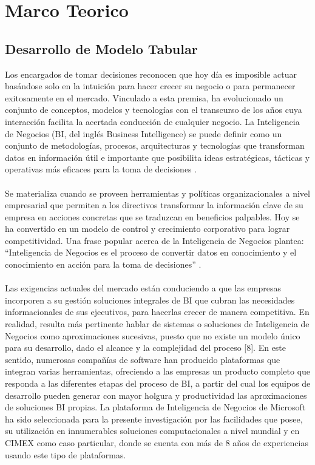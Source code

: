\documentclass[preprint,12pt]{elsarticle}
\begin{document}

\section{Marco Teorico}

\subsection{Desarrollo de Modelo Tabular}

Los encargados de tomar decisiones  reconocen que  hoy día  es imposible  actuar basándose  solo en  la intuición para hacer crecer su negocio o para permanecer exitosamente en el mercado. Vinculado a esta premisa, ha evolucionado un conjunto de conceptos, modelos y tecnologías con el transcurso de los años cuya interacción facilita la acertada conducción de cualquier negocio.  La Inteligencia de Negocios (BI, del inglés Business Intelligence) se puede definir como un conjunto de metodologías,  procesos,  arquitecturas  y  tecnologías  que  transforman  datos  en  información  útil  e importante que posibilita ideas estratégicas, tácticas y operativas más eficaces para la toma de decisiones .\\
\\
Se materializa cuando se proveen herramientas y políticas organizacionales a nivel empresarial que permiten a los directivos transformar la  información clave  de su empresa en acciones concretas que se traduzcan  en  beneficios  palpables.  Hoy  se  ha  convertido  en  un  modelo  de  control  y  crecimiento corporativo para lograr competitividad. Una frase popular acerca de la Inteligencia de Negocios plantea: “Inteligencia de Negocios es el proceso de convertir datos en conocimiento y el conocimiento en acción para la toma de decisiones” .\\
\\
Las  exigencias  actuales del  mercado  están  conduciendo  a que  las  empresas  incorporen  a  su  gestión soluciones integrales de BI que cubran las necesidades informacionales de sus ejecutivos, para hacerlas crecer  de manera  competitiva. En realidad, resulta  más  pertinente hablar  de sistemas  o soluciones  de Inteligencia de Negocios como aproximaciones sucesivas, puesto que no existe un modelo único para su desarrollo, dado el alcance y  la complejidad  del proceso [8]. En este sentido,  numerosas compañías de software  han  producido  plataformas  que  integran  varias  herramientas,  ofreciendo  a  las  empresas  un producto completo que responda a las diferentes etapas del proceso de BI, a partir del cual los equipos de desarrollo  pueden  generar  con  mayor  holgura  y  productividad  las  aproximaciones  de  soluciones  BI propias. La  plataforma de  Inteligencia de  Negocios de Microsoft  ha sido  seleccionada para la presente investigación por las facilidades que posee, su utilización en innumerables soluciones computacionales a nivel mundial  y en  CIMEX como caso  particular, donde se  cuenta con  más de 8  años de  experiencias usando este tipo de plataformas.\\
\end{document}
